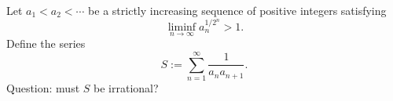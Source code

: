 Let $a_1<a_2<\cdots$ be a strictly increasing sequence of positive integers satisfying
\[
  \liminf_{n\to\infty} a_n^{1/2^n} > 1.
\]
Define the series
\[
  S:=\sum_{n=1}^\infty \frac{1}{a_n a_{n+1}}.
\]
Question: must $S$ be irrational?
